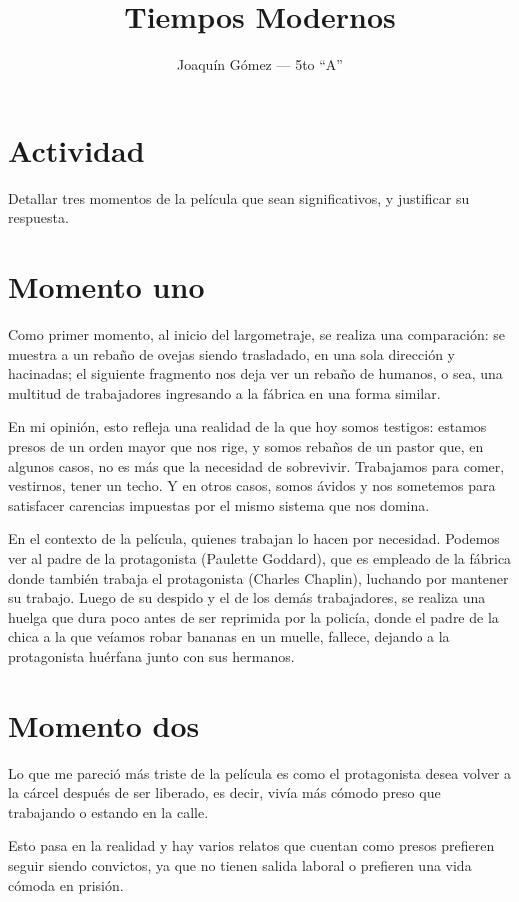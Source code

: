 \documentclass[a4paper, 12pt]{article}
\title{Tiempos Modernos}
\author{Joaquín Gómez --- 5to ``A''}
\begin{document}
\maketitle
\section*{Actividad}
Detallar tres momentos de la película que sean significativos, y justificar su respuesta.

\section{Momento uno}
Como primer momento, al inicio del largometraje, se realiza una comparación: se muestra a
un rebaño de ovejas siendo trasladado, en una sola dirección y hacinadas; el siguiente fragmento
nos deja ver un rebaño de humanos, o sea, una multitud de trabajadores ingresando a la fábrica
en una forma similar.

En mi opinión, esto refleja una realidad de la que hoy somos testigos: estamos presos de un orden
mayor que nos rige, y somos rebaños de un pastor que, en algunos casos, no es más que la necesidad
de sobrevivir. Trabajamos para comer, vestirnos, tener un techo. Y en otros casos, somos ávidos y nos
sometemos para satisfacer carencias impuestas por el mismo sistema que nos domina.

En el contexto de la película, quienes trabajan lo hacen por necesidad. Podemos ver al padre de la protagonista (Paulette Goddard),
que es empleado de la fábrica donde también trabaja el protagonista (Charles Chaplin), luchando por mantener su trabajo.
Luego de su despido y el de los demás trabajadores, se realiza una huelga que dura poco antes de ser reprimida
por la policía, donde el padre de la chica a la que veíamos robar bananas en un muelle, fallece, dejando a la protagonista 
huérfana junto con sus hermanos.

\section{Momento dos}
Lo que me pareció más triste de la película es como el protagonista desea volver a la cárcel después de ser liberado,
es decir, vivía más cómodo preso que trabajando o estando en la calle.

Esto pasa en la realidad y hay varios relatos que cuentan como presos prefieren seguir siendo convictos, ya que no 
tienen salida laboral o prefieren una vida cómoda en prisión.
\end{document}
